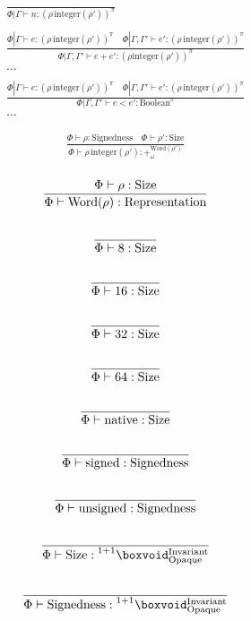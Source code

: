 \documentclass {article}
\begin{document}
\begin{gather*}
\frac
{}
{\Phi | \Gamma \vdash n : (\rho \, \text{integer}(\rho'))^\pi} \\
\\
\frac
{\Phi | \Gamma \vdash e : (\rho \, \text{integer}(\rho'))^\pi \quad \Phi | \Gamma, \Gamma' \vdash e' : (\rho \, \text{integer}(\rho'))^\pi}
{\Phi | \Gamma, \Gamma' \vdash e + e' : (\rho \text{integer}(\rho'))^\pi} \\
\dots \\
\\
\frac
{\Phi | \Gamma \vdash e : (\rho \, \text{integer}(\rho'))^\pi \quad \Phi | \Gamma, \Gamma' \vdash e' : (\rho \, \text{integer}(\rho'))^\pi}
{\Phi | \Gamma, \Gamma' \vdash e < e' : \text{Boolean}^\pi} \\
\dots
\end{gather*}

\begin{gather*}
\frac
{\Phi \vdash \rho : \text{Signedness} \quad \Phi \vdash \rho' : \text{Size}}
{\Phi \vdash \rho \, \text{integer}(\rho') : +^ {\text{Word} (\rho')}_\omega } \\
\end{gather*}

\begin{gather*}
\frac
{\Phi \vdash \rho : \text{Size}}
{\Phi \vdash \text{Word} (\rho) : \text{Representation}} \\
\\
\frac
{}
{\Phi \vdash 8 : \text{Size}} \\
\\
\frac
{}
{\Phi \vdash 16 : \text{Size}} \\
\\
\frac
{}
{\Phi \vdash 32 : \text{Size}} \\
\\
\frac
{}
{\Phi \vdash 64 : \text{Size}} \\
\\
\frac
{}
{\Phi \vdash \text{native} : \text{Size}} \\
\\
\frac
{}
{\Phi \vdash \text{signed} : \text{Signedness}} \\
\\
\frac
{}
{\Phi \vdash \text{unsigned} : \text{Signedness}} \\
\\
\frac
{}
{\Phi \vdash \text{Size} : \prescript {1 + 1} {} \boxvoid^{\text{Invariant}}_{\text{Opaque}}} \\
\\
\frac
{}
{\Phi \vdash \text{Signedness} : \prescript {1 + 1} {} \boxvoid^{\text{Invariant}}_{\text{Opaque}}}
\end{gather*}
\end{document}
